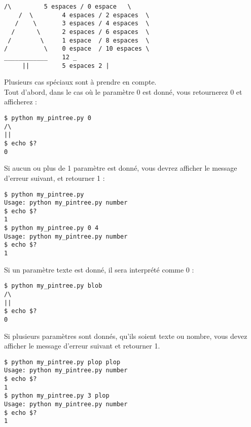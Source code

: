 \hspace*{-\parindent} %
\begin{minipage}{15.85cm} %
\lstset{language=sh}
\begin{lstlisting}[frame=single,title={Cas général 5}]
     /\         5 espaces / 0 espace   \
    /  \        4 espaces / 2 espaces  \
   /    \       3 espaces / 4 espaces  \
  /      \      2 espaces / 6 espaces  \
 /        \     1 espace  / 8 espaces  \
/          \    0 espace  / 10 espaces \
____________    12 _
     ||         5 espaces 2 |
\end{lstlisting}
\end{minipage} %

\bigskip

\noindent Plusieurs cas spéciaux sont à prendre en compte.\\

\noindent Tout d'abord, dans le cas où le paramètre 0 est donné, vous retournerez 0 et afficherez :

\bigskip

\lstset{language=sh}
\begin{lstlisting}[frame=single,title={Cas 0}]
$ python my_pintree.py 0
/\
||
$ echo $?
0
\end{lstlisting}

\bigskip

\noindent Si aucun ou plus de 1 paramètre est donné, vous devrez afficher le message d'erreur suivant, et retourner 1 : \\

\bigskip

\noindent {}

\bigskip

\lstset{language=sh}
\begin{lstlisting}[frame=single,title={Cas d'erreur}]
$ python my_pintree.py
Usage: python my_pintree.py number
$ echo $?
1
$ python my_pintree.py 0 4
Usage: python my_pintree.py number
$ echo $?
1
\end{lstlisting}



\noindent Si un paramètre texte est donné, il sera interprété comme 0 :

\bigskip

\lstset{language=sh}
\begin{lstlisting}[frame=single,title={Cas texte}]
$ python my_pintree.py blob
/\
||
$ echo $?
0
\end{lstlisting}

\bigskip

\noindent Si plusieurs paramètres sont donnés, qu'ils soient texte ou nombre, vous devez afficher le message d'erreur suivant et retourner 1.

\bigskip

\lstset{language=sh}
\begin{lstlisting}[frame=single,title={Cas texte d'erreur}]
$ python my_pintree.py plop plop
Usage: python my_pintree.py number
$ echo $?
1
$ python my_pintree.py 3 plop
Usage: python my_pintree.py number
$ echo $?
1
\end{lstlisting}

